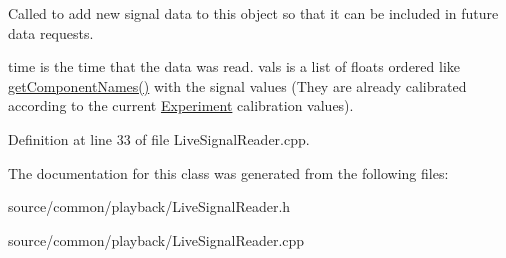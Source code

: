 Called to add new signal data to this object so that it can be included in future data requests. 

time is the time that the data was read. vals is a list of floats ordered like \hyperlink{class_picto_1_1_live_signal_reader_af1233a4748817eb0faf6ca4eafa7034a}{get\-Component\-Names()} with the signal values (They are already calibrated according to the current \hyperlink{class_picto_1_1_experiment}{Experiment} calibration values). 

Definition at line 33 of file Live\-Signal\-Reader.\-cpp.



The documentation for this class was generated from the following files\-:\begin{DoxyCompactItemize}
\item 
source/common/playback/Live\-Signal\-Reader.\-h\item 
source/common/playback/Live\-Signal\-Reader.\-cpp\end{DoxyCompactItemize}
